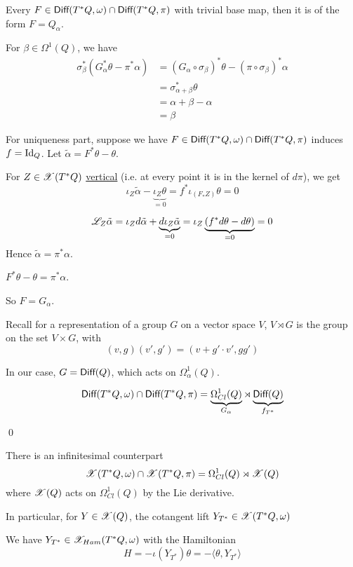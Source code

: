 \documentclass[x11names,reqno,14pt]{extarticle}
\begin{document}
Every $F \in {{\text{\sffamily {Diff}}}}(T^*Q,\omega)\cap{{\text{\sffamily {Diff}}}}(T^*Q,\pi)$ with trivial base map, then it is of the form $F = Q_\alpha$. 

\proof

For $\beta\in\Omega^1(Q)$, we have 
\begin{align*}
\sigma_\beta^*(G_\alpha^*\theta-\pi^*\alpha) & = (G_\alpha\circ\sigma_\beta)^*\theta - (\pi\circ\sigma_\beta)^*\alpha \\
& = \sigma_{\alpha+\beta}^*\theta \\
& = \alpha + \beta - \alpha \\
& = \beta
\end{align*}

For uniqueness part, suppose we have $F \in {{\text{\sffamily {Diff}}}}(T^*Q,\omega)\cap{{\text{\sffamily {Diff}}}}(T^*Q,\pi)$ induces $f = \operatorname{\mathrm{Id}}_Q$. Let $\tilde{\alpha} = F^*\theta - \theta$. 

For $Z \in \mathscr{X}(T^*Q)$ \underline{vertical} (i.e. at every point it is in the kernel of $d\pi$), we get 
\[
\iota_Z\tilde{\alpha}-\underbrace{\iota_Z\theta}_{=0} = f^*\iota_{(F_*Z)}\theta = 0
\]

\[
\mathscr{L}_Z\tilde{\alpha} = \iota_Zd\tilde{\alpha} + \underbrace{d\iota_Z\tilde{\alpha}}_{=0} = \iota_Z\underbrace{(f^*d\theta - d\theta)}_{=0} = 0
\]
Hence $\tilde{\alpha} = \pi^*\alpha$. 

$F^*\theta - \theta = \pi^*\alpha$. 

So $F = G_\alpha$.

Recall for a representation of a group $G$ on a vector space $V$, $V\rtimes G$ is the group on the set $V\times G$, with 
\[
(v, g) (v', g') = (v + g'\cdot v', gg')
\]

In our case, $G = {{\text{\sffamily {Diff}}}}(Q)$, which acts on $\Omega^1_\alpha(Q)$. 

\thm
\[
{{\text{\sffamily {Diff}}}}(T^*Q,\omega)\cap{{\text{\sffamily {Diff}}}}(T^*Q,\pi) = \underbrace{\Omega^1_{Cl}(Q)}_{G_\alpha} \rtimes \underbrace{{{\text{\sffamily {Diff}}}}(Q)}_{f_{T^*}}
\]

\proof

\qed

There is an infinitesimal counterpart 
\[
\mathscr{X}(T^*Q,\omega) \cap \mathscr{X}(T^*Q,\pi) = \Omega^1_{Cl}(Q)\rtimes\mathscr{X}(Q)
\]
where $\mathscr{X}(Q)$ acts on $\Omega_{Cl}^1(Q)$ by the Lie derivative. 

In particular, for $Y \in \mathscr{X}(Q)$, the cotangent lift $Y_{T^*} \in \mathscr{X}(T^*Q,\omega)$

\prop

We have $Y_{T^*}\in\mathscr{X}_{Ham}(T^*Q,\omega)$ with the Hamiltonian   
\[
H = -\iota(Y_{T^*})\theta = - \langle\theta,Y_{T^*}\rangle
\]
\end{document}
